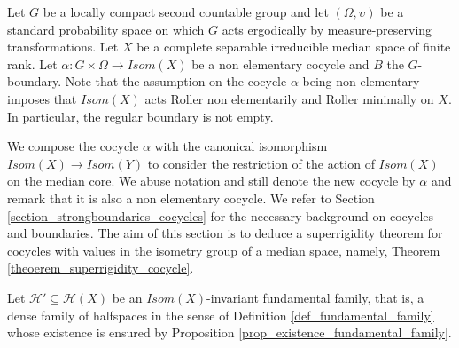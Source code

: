 \documentclass{amsart}
\numberwithin{equation}{section}
\newcommand{\HH}{\mathcal{H}}     %
\theoremstyle{definition}
\begin{document}
Let $G$ be a locally compact second countable group and let $(\Omega, \upsilon)$ be a standard probability space on which $G$ acts ergodically by measure-preserving transformations. Let $X$ be a complete separable irreducible median space of finite rank. Let $\alpha:G\times\Omega\rightarrow Isom(X)$ be a non elementary cocycle and $B$ the $G$-boundary. Note that the assumption on the cocycle $\alpha$ being non elementary imposes that $Isom(X)$ acts Roller non elementarily and Roller minimally on $X$. In particular, the regular boundary is not empty. \par 

We compose the cocycle $\alpha$ with the canonical isomorphism $Isom(X)\rightarrow Isom(Y)$ to consider the restriction of the action of $Isom(X)$ on the median core. We abuse notation and still denote the new cocycle by $\alpha$ and remark that it is also a non elementary cocycle. We refer to Section \ref{section_strongboundaries_cocycles} for the necessary background on cocycles and boundaries. The aim of this section is to deduce a superrigidity theorem for cocycles with values in the isometry group of a median space, namely, Theorem \ref{theoerem_superrigidity_cocycle}.\par 
Let $\HH'\subseteq \HH(X)$ be an $Isom(X)$-invariant fundamental family, that is, a dense family of halfspaces in the sense of Definition \ref{def_fundamental_family} whose existence is ensured by Proposition \ref{prop_existence_fundamental_family}.


\end{document}
